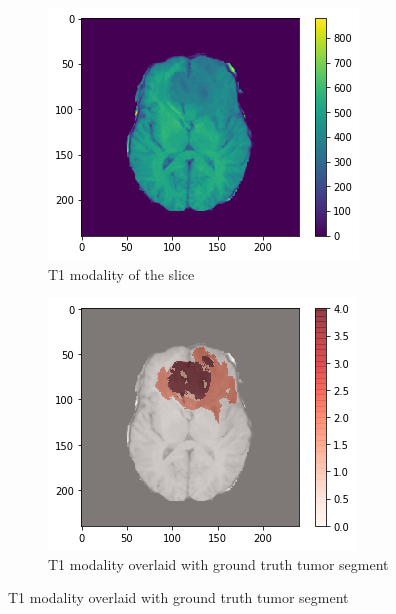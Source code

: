 \begin{figure}[H]
    \centering
    \begin{subfigure}{.33\textwidth}
        \centering
        \includegraphics[width=\linewidth]{chapters/07_brats3d/images/01_t1.png}
        \caption{T1 modality of the slice}
    \end{subfigure}%
    \begin{subfigure}{.33\textwidth}
        \centering
        \includegraphics[width=\linewidth]{chapters/07_brats3d/images/05_t1_segment.png}
        \caption{T1 modality overlaid with ground truth tumor segment}

\end{subfigure}
\end{figure}
